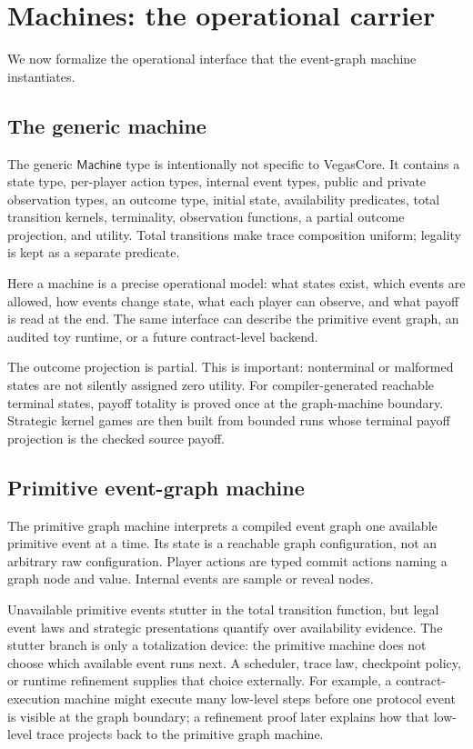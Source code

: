 \section{Machines: the operational carrier}
\label{sec:machines}

We now formalize the operational interface that the event-graph machine
instantiates.

\subsection{The generic machine}

The generic \(\mathsf{Machine}\) type is intentionally not specific to
VegasCore.  It contains a state type, per-player action types, internal
event types, public and private observation types, an outcome type,
initial state, availability predicates, total transition kernels,
terminality, observation functions, a partial outcome projection, and
utility.  Total transitions make trace composition uniform; legality is
kept as a separate predicate.

Here a machine is a precise operational model: what states exist,
which events are allowed, how events change state, what each player can
observe, and what payoff is read at the end.  The same interface can
describe the primitive event graph, an audited toy runtime, or a future
contract-level backend.

The outcome projection is partial.  This is important: nonterminal or
malformed states are not silently assigned zero utility.  For
compiler-generated reachable terminal states, payoff totality is proved
once at the graph-machine boundary.  Strategic kernel games are then
built from bounded runs whose terminal payoff projection is the checked
source payoff.

\subsection{Primitive event-graph machine}
\label{sec:mach:primitive}

The primitive graph machine interprets a compiled event graph one
available primitive event at a time.  Its state is a reachable graph
configuration, not an arbitrary raw configuration.  Player actions are
typed commit actions naming a graph node and value.  Internal events are
sample or reveal nodes.

Unavailable primitive events stutter in the total transition function,
but legal event laws and strategic presentations quantify over
availability evidence.  The stutter branch is only a totalization device:
the primitive machine does not choose which available event runs next.  A
scheduler, trace law, checkpoint policy, or runtime refinement supplies
that choice externally.  For example, a contract-execution machine might
execute many low-level steps before one protocol event is visible at the
graph boundary; a refinement proof later explains how that low-level
trace projects back to the primitive graph machine.

